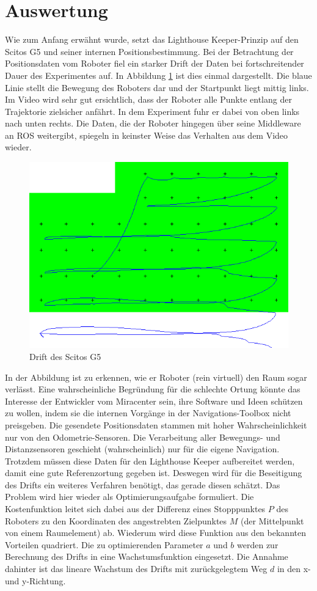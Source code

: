 \section{Auswertung}
Wie zum Anfang erwähnt wurde, setzt das Lighthouse Keeper-Prinzip auf den Scitos G5 und seiner internen Positionsbestimmung. Bei der Betrachtung der Positionsdaten vom Roboter fiel ein starker Drift der Daten bei fortschreitender Dauer des Experimentes auf. In Abbildung \ref{fig:Drift} ist dies einmal dargestellt. Die blaue Linie stellt die Bewegung des Roboters dar und der Startpunkt liegt mittig links. Im Video wird sehr gut ersichtlich, dass der Roboter alle Punkte entlang der Trajektorie zielsicher anfährt. In dem Experiment fuhr er dabei von oben links nach unten rechts. Die Daten, die der Roboter hingegen über seine Middleware an ROS weitergibt, spiegeln in keinster Weise das Verhalten aus dem Video wieder. 
\begin{figure}[H] 
\centering
\includegraphics[scale=0.38]{Bilder/Drift}
\caption{Drift des Scitos G5}
\label{fig:Drift}
\end{figure}
In der Abbildung ist zu erkennen, wie er Roboter (rein virtuell) den Raum sogar verlässt. Eine wahrscheinliche Begründung für die schlechte Ortung könnte das Interesse der Entwickler vom Miracenter sein, ihre Software und Ideen schützen zu wollen, indem sie die internen Vorgänge in der Navigations-Toolbox nicht preisgeben. Die gesendete Positionsdaten stammen mit hoher Wahrscheinlichkeit nur von den Odometrie-Sensoren. Die Verarbeitung aller Bewegungs- und Distanzsensoren geschieht (wahrscheinlich) nur für die eigene Navigation. Trotzdem müssen diese Daten für den Lighthouse Keeper aufbereitet werden, damit eine gute Referenzortung gegeben ist. Deswegen wird für die Beseitigung des Drifts ein weiteres Verfahren benötigt, das gerade diesen schätzt. Das Problem wird hier wieder als Optimierungsaufgabe formuliert. Die Kostenfunktion leitet sich dabei aus der Differenz eines Stopppunktes $P$ des Roboters zu den Koordinaten des angestrebten Zielpunktes $M$ (der Mittelpunkt von einem Raumelement) ab. Wiederum wird diese Funktion aus den bekannten Vorteilen quadriert. Die zu optimierenden Parameter $a$ und $b$ werden zur Berechnung des Drifts in eine Wachstumsfunktion eingesetzt. Die Annahme dahinter ist das lineare Wachstum des Drifts mit zurückgelegtem Weg $d$ in den x- und y-Richtung. 

